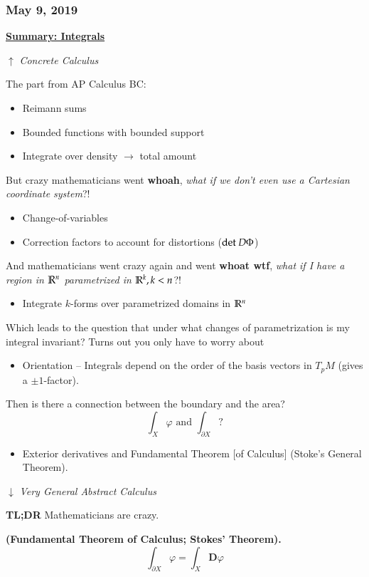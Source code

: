 \subsubsection*{May 9, 2019}

\ul{\textbf{Summary: Integrals}}

$\uparrow$ \emph{Concrete Calculus}

The part from AP Calculus BC: 
\begin{itemize}
	\item Reimann sums
	\item Bounded functions with bounded support
	\item Integrate over density $\rightarrow$ total amount
\end{itemize}
But crazy mathematicians went \textbf{whoah}, \emph{what if we don't even use a Cartesian coordinate system}?! 
\begin{itemize}
	\item Change-of-variables
	\item Correction factors to account for distortions ($\mathrm{det}\ D\Phi$)
\end{itemize} 
And mathematicians went crazy again and went \textbf{whoat wtf}, \emph{what if I have a region in $\mathbb{R}^n$ parametrized in $\mathbb{R}^k, k<n$}?!
\begin{itemize}
	\item Integrate $k$-forms over parametrized domains in $\mathbb{R}^n$
\end{itemize}
Which leads to the question that under what changes of parametrization is my integral invariant? Turns out you only have to worry about
\begin{itemize}
	\item Orientation -- Integrals depend on the order of the basis vectors in $T_pM$ (gives a $\pm 1$-factor). 
\end{itemize}
Then is there a connection between the boundary and the area? 
\[\int_X \varphi \text{ and } \int_{\partial X} ?\]
\begin{itemize}
	\item Exterior derivatives and Fundamental Theorem [of Calculus] (Stoke's General Theorem). 
\end{itemize}
$\downarrow$ \emph{Very General Abstract Calculus}

\textbf{TL;DR} Mathematicians are crazy. 

\begin{theorem}
	\textbf{(Fundamental Theorem of Calculus; Stokes' Theorem).} 
	\begin{equation}
		\int_{\partial X} \varphi = \int_{X} \bm{D}\varphi
	\end{equation}
\end{theorem}

